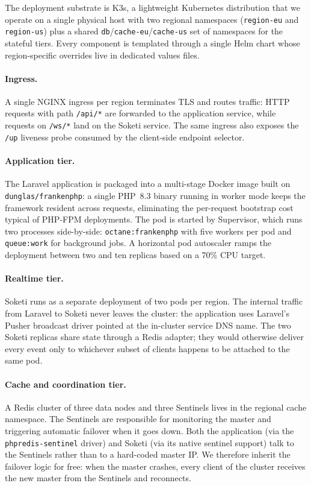 \documentclass{scrartcl}
\begin{document}
The deployment substrate is K3s, a lightweight Kubernetes distribution
that we operate on a single physical host with two regional namespaces
(\texttt{region-eu} and \texttt{region-us}) plus a shared
\texttt{db}/\texttt{cache-eu}/\texttt{cache-us} set of namespaces for
the stateful tiers. Every component is templated through a single Helm
chart whose region-specific overrides live in dedicated values files.

\paragraph{Ingress.} A single NGINX ingress per region terminates TLS
and routes traffic: HTTP requests with path \texttt{/api/*} are
forwarded to the application service, while requests on \texttt{/ws/*}
land on the Soketi service. The same ingress also exposes the
\texttt{/up} liveness probe consumed by the client-side endpoint
selector.

\paragraph{Application tier.} The Laravel application is packaged into a
multi-stage Docker image built on \texttt{dunglas/frankenphp}: a single
PHP~8.3 binary running in worker mode keeps the framework resident
across requests, eliminating the per-request bootstrap cost typical of
PHP-FPM deployments. The pod is started by Supervisor, which runs two
processes side-by-side: \texttt{octane:frankenphp} with five workers per
pod and \texttt{queue:work} for background jobs. A horizontal pod
autoscaler ramps the deployment between two and ten replicas based on a
70\% CPU target.

\paragraph{Realtime tier.} Soketi runs as a separate deployment of two
pods per region. The internal traffic from Laravel to Soketi never
leaves the cluster: the application uses Laravel's Pusher broadcast
driver pointed at the in-cluster service DNS name. The two Soketi
replicas share state through a Redis adapter; they would otherwise
deliver every event only to whichever subset of clients happens to be
attached to the same pod.

\paragraph{Cache and coordination tier.} A Redis cluster of three data
nodes and three Sentinels lives in the regional cache namespace. The
Sentinels are responsible for monitoring the master and triggering
automatic failover when it goes down. Both the application (via the
\texttt{phpredis-sentinel} driver) and Soketi (via its native sentinel
support) talk to the Sentinels rather than to a hard-coded master IP.
We therefore inherit the failover logic for free: when the master
crashes, every client of the cluster receives the new master from the
Sentinels and reconnects.
\end{document}
